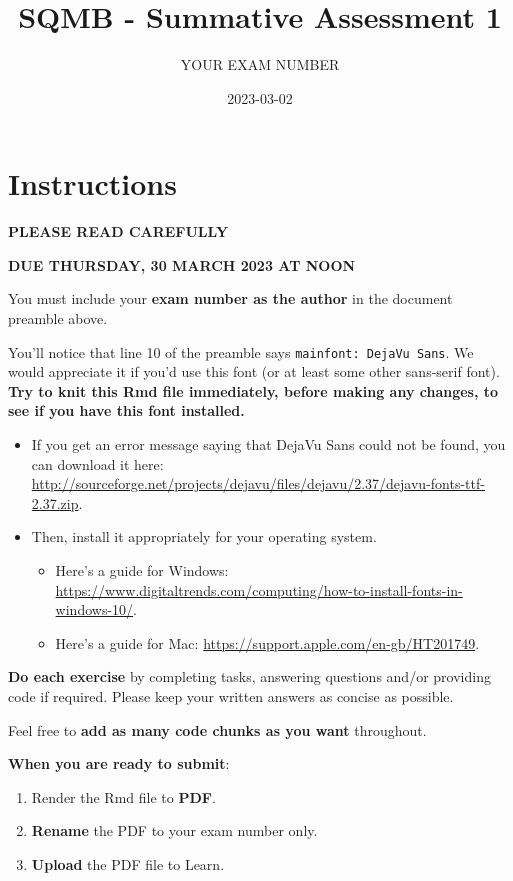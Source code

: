 \documentclass[
]{article}
\title{SQMB - Summative Assessment 1}
\author{YOUR EXAM NUMBER}
\date{2023-03-02}
\providecommand{\tightlist}{%
  \setlength{\itemsep}{0pt}\setlength{\parskip}{0pt}}
\begin{document}
\maketitle

\hypertarget{instructions}{%
\section{Instructions}\label{instructions}}

\textbf{PLEASE READ CAREFULLY}

\textbf{DUE THURSDAY, 30 MARCH 2023 AT NOON}

You must include your \textbf{exam number as the author} in the document
preamble above.

You'll notice that line 10 of the preamble says
\texttt{mainfont:\ DejaVu\ Sans}. We would appreciate it if you'd use
this font (or at least some other sans-serif font). \textbf{Try to knit
this Rmd file immediately, before making any changes, to see if you have
this font installed.}

\begin{itemize}
\tightlist
\item
  If you get an error message saying that DejaVu Sans could not be
  found, you can download it here:
  \url{http://sourceforge.net/projects/dejavu/files/dejavu/2.37/dejavu-fonts-ttf-2.37.zip}.
\item
  Then, install it appropriately for your operating system.

  \begin{itemize}
  \tightlist
  \item
    Here's a guide for Windows:
    \url{https://www.digitaltrends.com/computing/how-to-install-fonts-in-windows-10/}.
  \item
    Here's a guide for Mac:
    \url{https://support.apple.com/en-gb/HT201749}.
  \end{itemize}
\end{itemize}

\textbf{Do each exercise} by completing tasks, answering questions
and/or providing code if required. Please keep your written answers as
concise as possible.

Feel free to \textbf{add as many code chunks as you want} throughout.

\textbf{When you are ready to submit}:

\begin{enumerate}
\def\labelenumi{\arabic{enumi}.}
\tightlist
\item
  Render the Rmd file to \textbf{PDF}.
\item
  \textbf{Rename} the PDF to your exam number only.
\item
  \textbf{Upload} the PDF file to Learn.
\end{enumerate}
\end{document}

